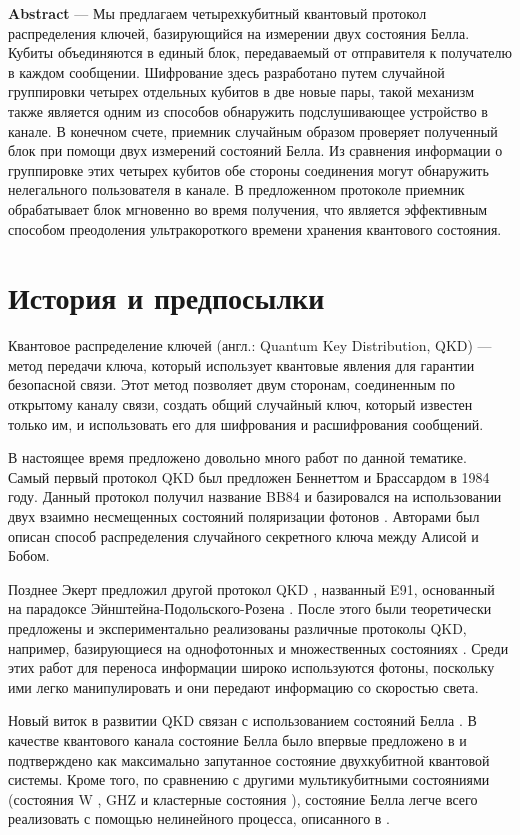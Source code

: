 \documentclass[a4paper,11pt]{article}
\author{Karamyshev}
\begin{document}
\textbf{Abstract} --- Мы предлагаем четырехкубитный квантовый протокол распределения ключей, базирующийся на измерении двух состояния Белла. Кубиты объединяются в единый блок, передаваемый от отправителя к получателю в каждом сообщении. Шифрование здесь разработано путем случайной группировки четырех отдельных кубитов в две новые пары, такой механизм также является одним из способов обнаружить подслушивающее устройство в канале. В конечном счете, приемник случайным образом проверяет полученный блок при помощи двух измерений состояний Белла. Из сравнения информации о группировке этих четырех кубитов обе стороны соединения могут обнаружить нелегального пользователя в канале. В предложенном протоколе приемник обрабатывает блок мгновенно во время получения, что является эффективным способом преодоления ультракороткого времени хранения квантового состояния.



\section{История и предпосылки}

Квантовое распределение ключей (англ.: Quantum Key Distribution, QKD) — метод передачи ключа, который использует квантовые явления для гарантии безопасной связи. Этот метод позволяет двум сторонам, соединенным по открытому каналу связи, создать общий случайный ключ, который известен только им, и использовать его для шифрования и расшифрования сообщений.


В настоящее время предложено довольно много работ по данной тематике. Самый первый протокол QKD был предложен Беннеттом и Брассардом в 1984 году. Данный протокол получил название BB84 и базировался на использовании двух взаимно несмещенных состояний поляризации фотонов \cite{BB84}. Авторами был описан способ распределения случайного секретного ключа между Алисой и Бобом. 
 
Позднее Экерт предложил другой протокол QKD \cite{E91}, названный E91, основанный на парадоксе Эйнштейна-Подольского-Розена \cite{EPR}. После этого были теоретически предложены и экспериментально реализованы различные протоколы QKD, например, базирующиеся на однофотонных \cite{liang2015simple} и множественных состояниях \cite{fourstate}. Среди этих работ для переноса информации широко используются фотоны, поскольку ими легко манипулировать и они передают информацию со скоростью света.

Новый виток в развитии QKD связан с использованием состояний Белла \cite{EPR}.
В качестве квантового канала состояние Белла было впервые предложено в \cite{Gao} и подтверждено как максимально запутанное состояние двухкубитной квантовой системы. Кроме того, по сравнению с другими мультикубитными состояниями (состояния W \cite{W}, GHZ \cite{GHZ} и кластерные состояния \cite{cluster}), состояние Белла легче всего реализовать с помощью нелинейного процесса, описанного в  \cite{twophotons}. 
\end{document}
